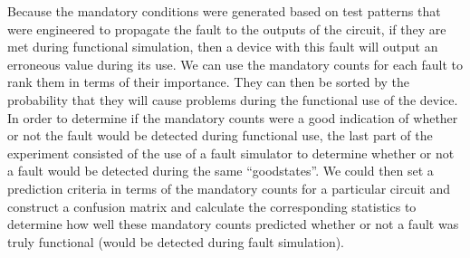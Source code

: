     Because the mandatory conditions were generated based on test patterns that were engineered to propagate the fault to the outputs of the circuit, if they are met during functional simulation, then a device with this fault will output an erroneous value during its use.  
    We can use the mandatory counts for each fault to rank them in terms of their importance.
    They can then be sorted by the probability that they will cause problems during the functional use of the device. 
    In order to determine if the mandatory counts were a good indication of whether or not the fault would be detected during functional use, the last part of the experiment consisted of the use of a fault simulator to determine whether or not a fault would be detected during the same ``goodstates''. 
    We could then set a prediction criteria in terms of the mandatory counts for a particular circuit and construct a confusion matrix and calculate the corresponding statistics to determine how well these mandatory counts predicted whether or not a fault was truly functional (would be detected during fault simulation). 
    